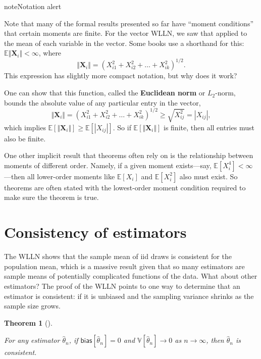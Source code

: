 \documentclass[
  13pt,
  letterpaper,
  DIV=11,
  numbers=noendperiod]{scrreprt}
\newcommand{\mb}{\bm}
\newcommand{\E}{\mathbb{E}}
\newcommand{\V}{\mathbb{V}}
\newcommand{\X}{\mb{X}}
\theoremstyle{plain}
\newtheorem{theorem}{Theorem}[chapter]
\theoremstyle{plain}
\theoremstyle{definition}
\theoremstyle{definition}
\theoremstyle{remark}
\begin{document}
\begin{bookcallout}{note}{Notation alert}

Note that many of the formal results presented so far have ``moment
conditions'' that certain moments are finite. For the vector WLLN, we
saw that applied to the mean of each variable in the vector. Some books
use a shorthand for this: \(\E\Vert \X_i\Vert < \infty\), where \[
\Vert\X_i\Vert = \left(X_{i1}^2 + X_{i2}^2 + \ldots + X_{ik}^2\right)^{1/2}. 
\] This expression has slightly more compact notation, but why does it
work?

One can show that this function, called the \textbf{Euclidean norm} or
\(L_2\)-norm, bounds the absolute value of any particular entry in the
vector, \[
\Vert\X_i\Vert = \left(X_{i1}^2 + X_{i2}^2 + \ldots + X_{ik}^2\right)^{1/2}
\geq \sqrt{X_{ij}^2} = |X_{ij}|,
\] which implies \(\E[\Vert \X_i\Vert] \geq \E[|X_{ij}|]\). So if
\(\E[\Vert \X_i\Vert]\) is finite, then all entries must also be finite.

One other implicit result that theorems often rely on is the
relationship between moments of different order. Namely, if a given
moment exists---say, \(\E[X_i^4] < \infty\)---then all lower-order
moments like \(\E[X_i]\) and \(\E[X_i^2]\) also must exist. So theorems
are often stated with the lowest-order moment condition required to make
sure the theorem is true.

\end{bookcallout}

\section{Consistency of estimators}\label{consistency-of-estimators}

The WLLN shows that the sample mean of iid draws is consistent for the
population mean, which is a massive result given that so many estimators
are sample means of potentially complicated functions of the data. What
about other estimators? The proof of the WLLN points to one way to
determine that an estimator is consistent: if it is unbiased and the
sampling variance shrinks as the sample size grows.

\begin{theorem}[]\protect\hypertarget{thm-consis}{}\label{thm-consis}

For any estimator \(\widehat{\theta}_n\), if
\(\textsf{bias}[\widehat{\theta}_n] = 0\) and
\(\V[\widehat{\theta}_n] \rightarrow 0\) as \(n\rightarrow \infty\),
then \(\widehat{\theta}_n\) is consistent.

\end{theorem}
\end{document}
